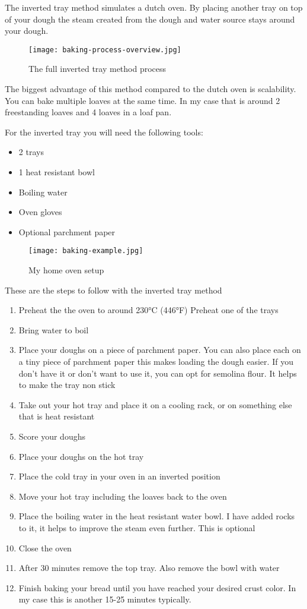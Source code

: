 The inverted tray method simulates a dutch oven.
By placing another tray on top of your dough the steam
created from the dough and water source stays
around your dough.

\begin{figure}[!htb]
  \texttt{[image: baking-process-overview.jpg]}
  \caption{The full inverted tray method process}
\end{figure}


The biggest advantage of this method compared to the
dutch oven is scalability. You can bake multiple loaves
at the same time. In my case that is around 2 freestanding
loaves and 4 loaves in a loaf pan.

For the inverted tray you will need the following tools:
\begin{itemize}
\item 2 trays
\item 1 heat resistant bowl
\item Boiling water
\item Oven gloves
\item Optional parchment paper
\end{itemize}

\begin{figure}[!htb]
  \texttt{[image: baking-example.jpg]}
  \caption{My home oven setup}
\end{figure}

These are the steps to follow with the inverted tray method
\begin{enumerate}
\item Preheat the the oven to around 230°C (446°F)
Preheat one of the trays
\item Bring water to boil
\item Place your doughs on a piece of parchment paper. You
can also place each on a tiny piece of parchment paper
this makes loading the dough easier. If you don't
have it or don't want to use it, you can opt for 
semolina flour. It helps to make the tray non stick
\item Take out your hot tray and place it
on a cooling rack, or on something else that
is heat resistant
\item Score your doughs
\item Place your doughs on the hot tray
\item Place the cold tray in your oven in an inverted position
\item Move your hot tray including the loaves back
to the oven
\item Place the boiling water in the heat resistant
water bowl. I have added rocks to it, it helps
to improve the steam even further. This is optional
\item Close the oven
\item After 30 minutes remove the top tray. Also remove the bowl with water
\item Finish baking your bread until you have reached your desired
crust color. In my case this is another 15-25 minutes typically.
\end{enumerate}

